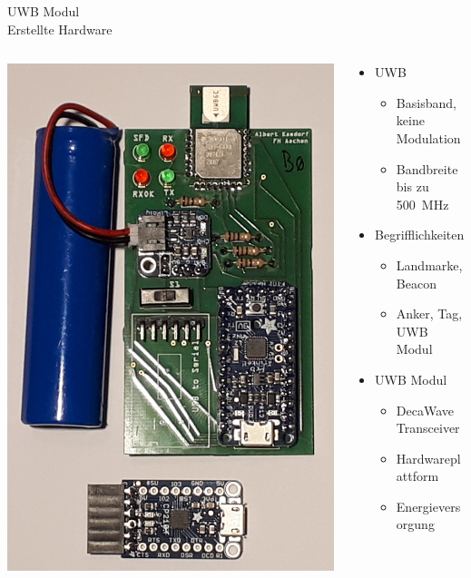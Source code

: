 \documentclass{beamer}
\begin{document}
\begin{frame}{UWB Modul\\\normalsize{Erstellte Hardware}}
	\begin{columns}
		\begin{column}{0.5\linewidth}
			\centering
			\includegraphics[width=0.8\linewidth]{uwb_modul2}
		\end{column}
		\begin{column}{0.5\linewidth}
			\begin{itemize}
				\item<1-> UWB
				\begin{itemize}
					\item Basisband, keine Modulation
					\item Bandbreite bis zu \SI{500}{\MHz}
				\end{itemize}
				\item<2-> Begrifflichkeiten
				\begin{itemize}
					\item Landmarke, Beacon
					\item Anker, Tag, UWB Modul
				\end{itemize}
				\item<3-> UWB Modul
				\begin{itemize}
					\item DecaWave Transceiver
					\item Hardwareplattform
					\item Energieversorgung
				\end{itemize}
			\end{itemize}
		\end{column}
	\end{columns}
\end{frame}
\end{document}
